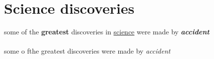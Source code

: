 \documentclass{article}
\begin{document}
	\section{Science discoveries}
	some of the \textbf{greatest} discoveries in \underline{science} were made by \textbf{\textit{accident}}
	
	\paragraph{}
	some o fthe greatest discoveries were made by \emph{accident}
	
\end{document}
